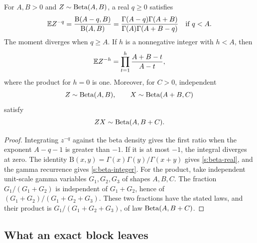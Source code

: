 \begin{lemma}\label{s:beta-identities}
For \(A,B>0\) and \(Z\sim\operatorname{Beta}(A,B)\), a real \(q\ge0\) satisfies
\begin{equation}\label{s:beta-real}
 \mathbb E Z^{-q}
 =\frac{\mathrm B(A-q,B)}{\mathrm B(A,B)}
 =\frac{\Gamma(A-q)\Gamma(A+B)}
        {\Gamma(A)\Gamma(A+B-q)}
 \quad\text{if }q<A.
\end{equation}
The moment diverges when \(q\ge A\). If \(h\) is a nonnegative integer
with \(h<A\), then
\begin{equation}\label{s:beta-integer}
 \mathbb E Z^{-h}=\prod_{t=1}^h\frac{A+B-t}{A-t},
\end{equation}
where the product for \(h=0\) is one. Moreover, for \(C>0\), independent
\[
 Z\sim\operatorname{Beta}(A,B),\qquad X\sim\operatorname{Beta}(A+B,C)
\]
satisfy
\begin{equation}\label{s:beta-product}
 ZX\sim\operatorname{Beta}(A,B+C).
\end{equation}
\end{lemma}
\begin{proof}
Integrating \(z^{-q}\) against the beta density gives the first ratio
when the exponent \(A-q-1\) is greater than \(-1\). If it is at most
\(-1\), the integral diverges at zero. The identity
\(\mathrm B(x,y)=\Gamma(x)\Gamma(y)/\Gamma(x+y)\) gives
\eqref{s:beta-real}, and the gamma recurrence gives
\eqref{s:beta-integer}. For the product, take independent unit-scale
gamma variables \(G_1,G_2,G_3\) of shapes \(A,B,C\).
The fraction \(G_1/(G_1+G_2)\) is independent of \(G_1+G_2\), hence
of \((G_1+G_2)/(G_1+G_2+G_3)\). These two fractions have the stated
laws, and their product is \(G_1/(G_1+G_2+G_3)\), of law
\(\operatorname{Beta}(A,B+C)\).
\end{proof}

\subsection{What an exact block leaves}

